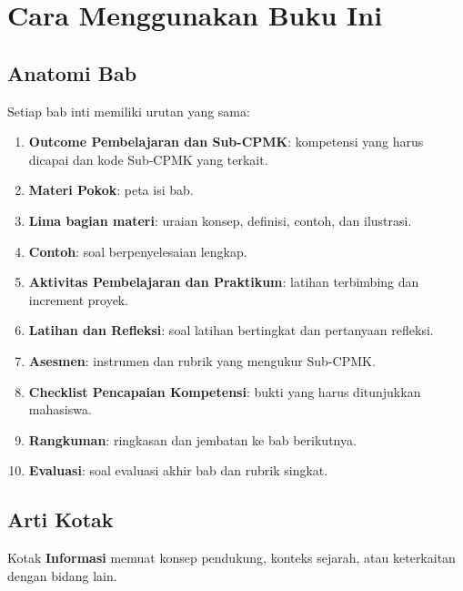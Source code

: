 \chapter*{Cara Menggunakan Buku Ini}

\section*{Anatomi Bab}

Setiap bab inti memiliki urutan yang sama:
\begin{enumerate}[label=\arabic*.,leftmargin=*]
  \item \textbf{Outcome Pembelajaran dan Sub-CPMK}: kompetensi yang
        harus dicapai dan kode Sub-CPMK yang terkait.
  \item \textbf{Materi Pokok}: peta isi bab.
  \item \textbf{Lima bagian materi}: uraian konsep, definisi, contoh,
        dan ilustrasi.
  \item \textbf{Contoh}: soal berpenyelesaian lengkap.
  \item \textbf{Aktivitas Pembelajaran dan Praktikum}: latihan
        terbimbing dan increment proyek.
  \item \textbf{Latihan dan Refleksi}: soal latihan bertingkat dan
        pertanyaan refleksi.
  \item \textbf{Asesmen}: instrumen dan rubrik yang mengukur Sub-CPMK.
  \item \textbf{Checklist Pencapaian Kompetensi}: bukti yang harus
        ditunjukkan mahasiswa.
  \item \textbf{Rangkuman}: ringkasan dan jembatan ke bab berikutnya.
  \item \textbf{Evaluasi}: soal evaluasi akhir bab dan rubrik singkat.
\end{enumerate}

\section*{Arti Kotak}

\begin{infobox}
Kotak \textbf{Informasi} memuat konsep pendukung, konteks sejarah,
atau keterkaitan dengan bidang lain.
\end{infobox}

